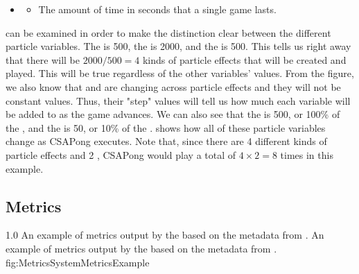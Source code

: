 \begin{singlespace}
\begin{itemize}[nolistsep,topsep=5pt]
		\item {}
		\begin{itemize}[nolistsep,topsep=0pt]
			\item The amount of time in seconds that a single game lasts.
		\end{itemize}

	\end{itemize}

\end{singlespace}

 can be examined in order to make the distinction clear between the different particle variables. The  is 500, the  is 2000, and the  is 500. This tells us right away that there will be $ 2000 / 500 = 4 $ kinds of particle effects that will be created and played\footnotemark. This will be true regardless of the other variables' values. From the figure, we also know that  and  are changing across particle effects and they will not be constant values. Thus, their "step" values will tell us how much each variable will be added to as the game advances. We can also see that the  is 500, or 100\% of the , and the  is 50, or 10\% of the .  shows how all of these particle variables change as CSAPong executes. Note that, since there are 4 different kinds of particle effects and 2 , CSAPong would play a total of $ 4 \times 2 = 8 $ times in this example.



\subsection{Metrics}\label{ssec:instr_metrics_system_metrics}

{1.0}
{An example of metrics output by the  based on the metadata from .}
{An example of metrics output by the  based on the metadata from . }
{fig:MetricsSystemMetricsExample}


